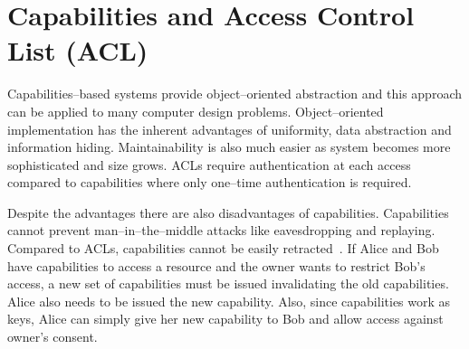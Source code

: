 \documentclass[11pt,a4paper]{article}
\begin{document}
\section{Capabilities and Access Control List (ACL)}
Capabilities--based systems provide object--oriented abstraction and this approach can be applied to many computer design problems. Object--oriented implementation has the inherent advantages of uniformity, data abstraction and information hiding. Maintainability is also much easier as system becomes more sophisticated and size grows. ACLs require authentication at each access compared to capabilities where only one--time authentication is required.

Despite the advantages there are also disadvantages of capabilities. Capabilities cannot prevent man--in--the--middle attacks like eavesdropping and replaying. Compared to ACLs, capabilities cannot be easily retracted~\cite{distributed-systems-coulouris}. If Alice and Bob have capabilities to access a resource and the owner wants to restrict Bob's access, a new set of capabilities must be issued invalidating the old capabilities. Alice also needs to be issued the new capability. Also, since capabilities work as keys, Alice can simply give her new capability to Bob and allow access against owner's consent.

\nocite{*}

\end{document}
